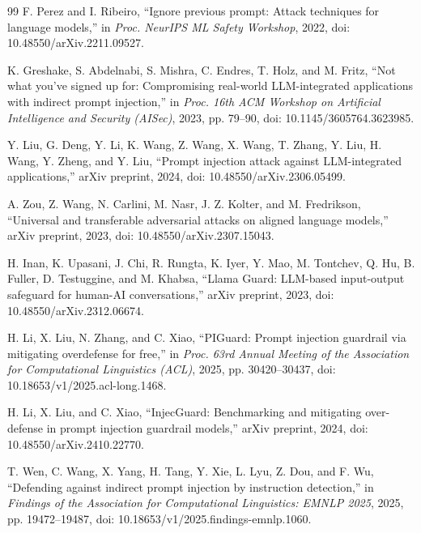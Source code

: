 \documentclass[conference]{IEEEtran}
\begin{document}
\begin{thebibliography}{99}
F. Perez and I. Ribeiro, ``Ignore previous prompt: Attack techniques for
language models,'' in \emph{Proc. NeurIPS ML Safety Workshop}, 2022,
doi: 10.48550/arXiv.2211.09527.

K. Greshake, S. Abdelnabi, S. Mishra, C. Endres, T. Holz, and M. Fritz,
``Not what you've signed up for: Compromising real-world LLM-integrated
applications with indirect prompt injection,'' in \emph{Proc. 16th ACM
Workshop on Artificial Intelligence and Security (AISec)}, 2023, pp. 79--90,
doi: 10.1145/3605764.3623985.

Y. Liu, G. Deng, Y. Li, K. Wang, Z. Wang, X. Wang, T. Zhang, Y. Liu, H. Wang,
Y. Zheng, and Y. Liu, ``Prompt injection attack against LLM-integrated
applications,'' arXiv preprint, 2024, doi: 10.48550/arXiv.2306.05499.

A. Zou, Z. Wang, N. Carlini, M. Nasr, J. Z. Kolter, and M. Fredrikson,
``Universal and transferable adversarial attacks on aligned language models,''
arXiv preprint, 2023, doi: 10.48550/arXiv.2307.15043.

H. Inan, K. Upasani, J. Chi, R. Rungta, K. Iyer, Y. Mao, M. Tontchev, Q. Hu,
B. Fuller, D. Testuggine, and M. Khabsa, ``Llama Guard: LLM-based input-output
safeguard for human-AI conversations,'' arXiv preprint, 2023,
doi: 10.48550/arXiv.2312.06674.

H. Li, X. Liu, N. Zhang, and C. Xiao, ``PIGuard: Prompt injection guardrail
via mitigating overdefense for free,'' in \emph{Proc. 63rd Annual Meeting of
the Association for Computational Linguistics (ACL)}, 2025, pp. 30420--30437,
doi: 10.18653/v1/2025.acl-long.1468.

H. Li, X. Liu, and C. Xiao, ``InjecGuard: Benchmarking and mitigating
over-defense in prompt injection guardrail models,'' arXiv preprint, 2024,
doi: 10.48550/arXiv.2410.22770.

T. Wen, C. Wang, X. Yang, H. Tang, Y. Xie, L. Lyu, Z. Dou, and F. Wu,
``Defending against indirect prompt injection by instruction detection,'' in
\emph{Findings of the Association for Computational Linguistics: EMNLP 2025},
2025, pp. 19472--19487, doi: 10.18653/v1/2025.findings-emnlp.1060.


\end{thebibliography}
\end{document}
